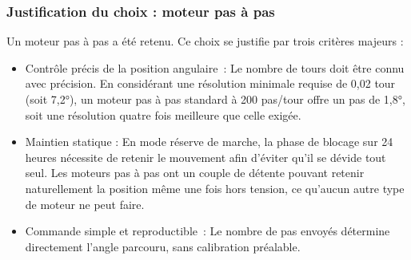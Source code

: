 \subsubsection{Justification du choix : moteur pas à pas}
Un moteur pas à pas a été retenu. Ce choix se justifie par trois critères majeurs :
\begin{itemize}
    \setlength{\itemsep}{6pt}
    \item Contrôle précis de la position angulaire~: Le nombre de tours doit être connu avec précision. En considérant une résolution minimale requise de 0,02 tour (soit 7,2°), un moteur pas à pas standard à 200 pas/tour offre un pas de 1,8°, soit une résolution quatre fois meilleure que celle exigée.
    
    \item Maintien statique : En mode réserve de marche, la phase de blocage sur 24 heures nécessite de retenir le mouvement afin d'éviter qu'il se dévide tout seul. Les moteurs pas à pas ont un couple de détente pouvant retenir naturellement la position même une fois hors tension, ce qu'aucun autre type de moteur ne peut faire.
    
    \item Commande simple et reproductible~: Le nombre de pas envoyés détermine directement l'angle parcouru, sans calibration préalable.
\end{itemize}
